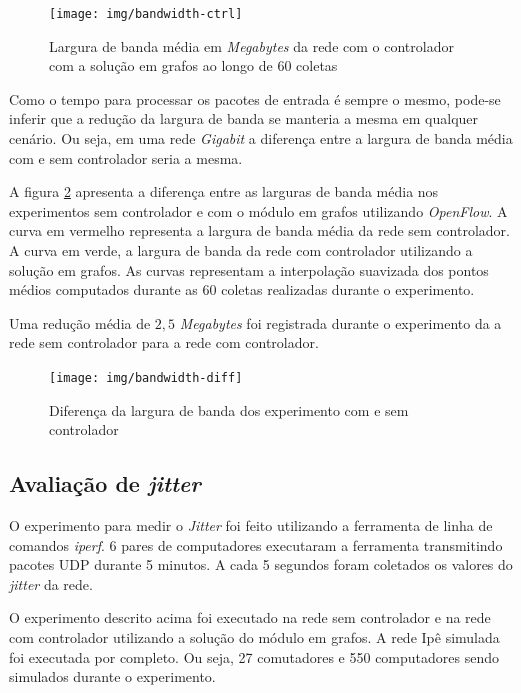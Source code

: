 \break

\begin{figure}[!htb]
    \centering
    \label{fig:bandwidth-ctrl}
    \texttt{[image: img/bandwidth-ctrl]}
    \caption{Largura de banda média em \emph{Megabytes} da rede com o
        controlador com a solução em grafos ao longo de 60 coletas}
\end{figure}

Como o tempo para processar os pacotes de entrada é sempre o mesmo, pode-se
inferir que a redução da largura de banda se manteria a mesma em qualquer
cenário.
Ou seja, em uma rede \emph{Gigabit} a diferença entre a largura de banda
média com e sem controlador seria a mesma.

A figura \ref{fig:bandwidth-diff} apresenta a diferença entre as larguras de
banda média nos experimentos sem controlador e com o  módulo em grafos
utilizando \emph{OpenFlow}.
A curva em vermelho representa a largura de banda média da rede sem
controlador.
A curva em verde, a largura de banda da rede com controlador utilizando a
solução em grafos.
As curvas representam a interpolação suavizada dos pontos médios computados
durante as 60 coletas realizadas durante o experimento.

Uma redução média de $2,5$ \emph{Megabytes} foi registrada durante o
experimento da a rede sem controlador para a rede com controlador.

\begin{figure}[!htb]
    \centering
    \label{fig:bandwidth-diff}
    \texttt{[image: img/bandwidth-diff]}
    \caption{Diferença da largura de banda dos experimento com e sem
    controlador}
\end{figure}



\subsection{Avaliação de \emph{jitter}}

O experimento para medir o \emph{Jitter} foi feito utilizando a ferramenta
de linha de comandos \emph{iperf}.
6 pares de computadores executaram a ferramenta transmitindo pacotes
UDP durante 5 minutos.
A cada 5 segundos foram coletados os valores do \emph{jitter} da rede.

O experimento descrito acima foi executado na rede sem controlador e na rede
com controlador utilizando a solução do módulo em grafos.
A rede Ipê simulada foi executada por completo.
Ou seja, 27 comutadores e 550 computadores sendo simulados durante o
experimento.


